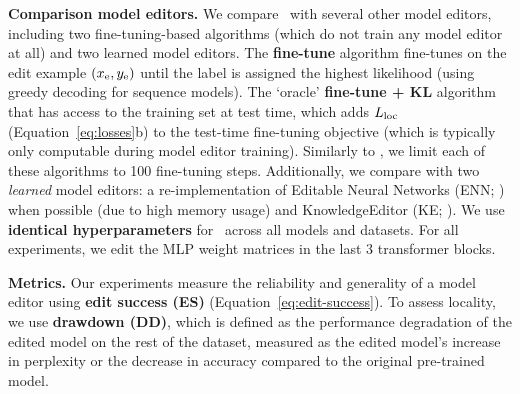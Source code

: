 \documentclass{article}
\begin{document}
\textbf{Comparison model editors.}
We compare \name~with several other model editors, including two fine-tuning-based algorithms (which do not train any model editor at all) and two learned model editors. The \textbf{fine-tune} algorithm fine-tunes on the edit example $(x_\text{e},y_\text{e})$ until the label is assigned the highest likelihood (using greedy decoding for sequence models). The `oracle' \textbf{fine-tune + KL} algorithm that has access to the training set at test time, which adds $L_\text{loc}$ (Equation~\ref{eq:losses}b) to the test-time fine-tuning objective (which is typically only computable during model editor training). Similarly to \cite{Cao2021EditingFK}, we limit each of these algorithms to 100 fine-tuning steps. Additionally, we compare with two \textit{learned} model editors: a re-implementation of Editable Neural Networks (ENN; \citealp{Sinitsin2020Editable}) when possible (due to high memory usage) and KnowledgeEditor (KE; \citealp{Cao2021EditingFK}). We use \textbf{identical hyperparameters} for \name~across all models and datasets. For all experiments, we edit the MLP weight matrices in the last 3 transformer blocks.

\textbf{Metrics.} Our experiments measure the reliability and generality of a model editor using \textbf{edit success (ES)} (Equation~\ref{eq:edit-success}). To assess locality, we use \textbf{drawdown (DD)}, which is defined as the performance degradation of the edited model on the rest of the dataset, measured as the edited model's increase in perplexity or the decrease in accuracy compared to the original pre-trained model.


\end{document}
